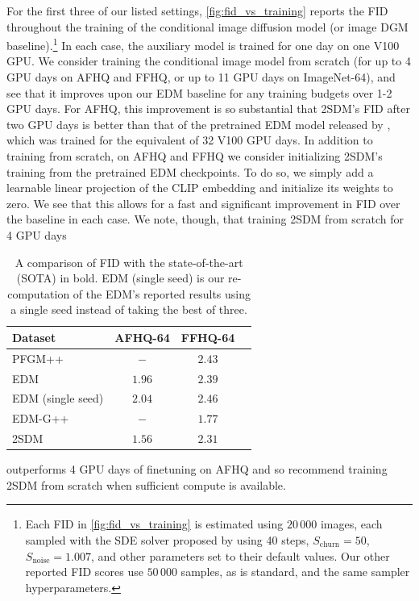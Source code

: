 For the first three of our listed settings, \cref{fig:fid_vs_training} reports the FID throughout the training of the conditional image diffusion model (or image DGM baseline).\footnote{Each FID in \cref{fig:fid_vs_training} is estimated using $20\,000$ images, each sampled with the SDE solver proposed by \citet{karras2022elucidating} using 40 steps, $S_\text{churn}=50$, $S_\text{noise}=1.007$, and other parameters set to their default values. Our other reported FID scores use $50\,000$ samples, as is standard, and the same sampler hyperparameters.}  In each case, the auxiliary model is trained for one day on one V100 GPU. We consider training the conditional image model from scratch (for up to 4 GPU days on AFHQ and FFHQ, or up to 11 GPU days on ImageNet-64), and see that it improves upon our EDM baseline for any training budgets over 1-2 GPU days. For AFHQ, this improvement is so substantial that 2SDM's FID after two GPU days is better than that of the pretrained EDM model released by \citet{karras2022elucidating}, which was trained for the equivalent of 32 V100 GPU days. In addition to training from scratch, on AFHQ and FFHQ we consider initializing 2SDM's training from the pretrained EDM checkpoints. To do so, we simply add a learnable linear projection of the CLIP embedding and initialize its weights to zero. We see that this allows for a fast and significant improvement in FID over the baseline in each case. We note, though, that training 2SDM from scratch for 4 GPU days 
\begin{table}
\centering
\caption{A comparison of FID with the state-of-the-art (SOTA) in bold. EDM (single seed) is our re-computation of the EDM's reported results using a single seed instead of taking the best of three.}
\label{tab:sota}
\begin{tabular}{lccc}
\midrule
Dataset         & AFHQ-64 & FFHQ-64 \\
\midrule
PFGM++~\citep{xu2023pfgm++}          & $-$ & $2.43$ \\
EDM~\citep{karras2022elucidating}
& $1.96$ & $2.39$  \\
EDM (single seed)     & $2.04$ & $2.46$  \\
EDM-G++~\citep{kim2022refining}               & $-$    & $\mathbf{1.77}$  \\
2SDM            & $\mathbf{1.56}$ & $2.31$ \\
\end{tabular}
\end{table}
outperforms 4 GPU days of finetuning on AFHQ and so recommend training 2SDM from scratch when sufficient compute is available.

